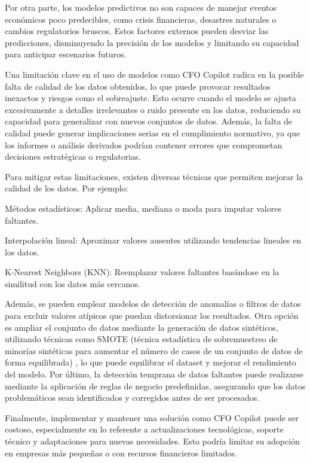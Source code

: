 \documentclass[12pt,letterpaper,oneside]{report}
\renewcommand{\_}{\UnderscoreOriginal\allowbreak}
\begin{document}
Por otra parte, los modelos predictivos no son capaces de manejar eventos económicos poco predecibles, como crisis financieras, desastres naturales o cambios regulatorios bruscos. Estos factores externos pueden desviar las predicciones, disminuyendo la precisión de los modelos y limitando su capacidad para anticipar escenarios futuros.

Una limitación clave en el uso de modelos como CFO Copilot radica en la posible falta de calidad de los datos obtenidos, lo que puede provocar resultados inexactos y riesgos como el sobreajuste. Esto ocurre cuando el modelo se ajusta excesivamente a detalles irrelevantes o ruido presente en los datos, reduciendo su capacidad para generalizar con nuevos conjuntos de datos. Además, la falta de calidad puede generar implicaciones serias en el cumplimiento normativo, ya que los informes o análisis derivados podrían contener errores que comprometan decisiones estratégicas o regulatorias.

Para mitigar estas limitaciones, existen diversas técnicas que permiten mejorar la calidad de los datos. Por ejemplo:

Métodos estadísticos: Aplicar media, mediana o moda para imputar valores faltantes.

Interpolación lineal: Aproximar valores ausentes utilizando tendencias lineales en los datos.

K-Nearest Neighbors (KNN): Reemplazar valores faltantes basándose en la similitud con los datos más cercanos.

Además, se pueden emplear modelos de detección de anomalías o filtros de datos para excluir valores atípicos que puedan distorsionar los resultados. Otra opción es ampliar el conjunto de datos mediante la generación de datos sintéticos, utilizando técnicas como SMOTE (técnica estadística de sobremuestreo de minorías sintéticas para aumentar el número de casos de un conjunto de datos de forma equilibrada) \parencite{Chawla2002}, lo que puede equilibrar el dataset y mejorar el rendimiento del modelo. Por último, la detección temprana de datos faltantes puede realizarse mediante la aplicación de reglas de negocio predefinidas, asegurando que los datos problemáticos sean identificados y corregidos antes de ser procesados.

Finalmente, implementar y mantener una solución como CFO Copilot puede ser costoso, especialmente en lo referente a actualizaciones tecnológicas, soporte técnico y adaptaciones para nuevas necesidades. Esto podría limitar su adopción en empresas más pequeñas o con recursos financieros limitados.
\end{document}
